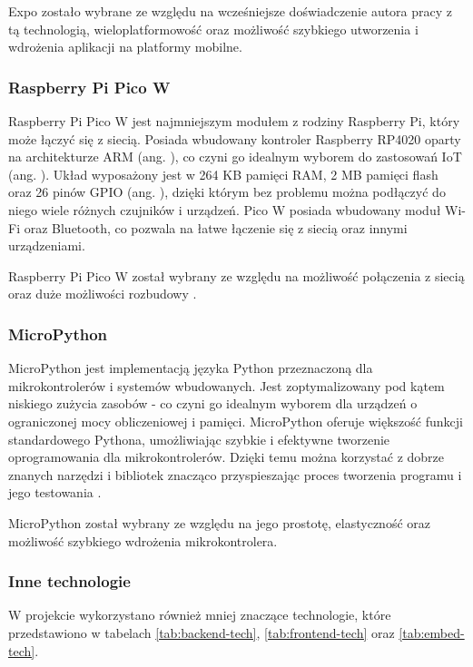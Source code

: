 Expo zostało wybrane ze względu na wcześniejsze doświadczenie autora pracy z tą technologią, wieloplatformowość oraz możliwość szybkiego utworzenia i wdrożenia aplikacji na platformy mobilne.

\subsubsection*{Raspberry Pi Pico W}

Raspberry Pi Pico W jest najmniejszym modułem z rodziny Raspberry Pi, który może łączyć się z siecią. Posiada wbudowany kontroler Raspberry RP4020 oparty na architekturze ARM (ang. ), co czyni go idealnym wyborem do zastosowań IoT (ang. ). Układ wyposażony jest w 264 KB pamięci RAM, 2 MB pamięci flash oraz 26 pinów GPIO (ang. ), dzięki którym bez problemu można podłączyć do niego wiele różnych czujników i urządzeń. Pico W posiada wbudowany moduł Wi-Fi oraz Bluetooth, co pozwala na łatwe łączenie się z siecią oraz innymi urządzeniami.

Raspberry Pi Pico W został wybrany ze względu na możliwość połączenia z siecią oraz duże możliwości rozbudowy \cite{bib:picoW}.

\subsubsection*{MicroPython}

MicroPython jest implementacją języka Python przeznaczoną dla mikrokontrolerów i systemów wbudowanych. Jest zoptymalizowany pod kątem niskiego zużycia zasobów - co czyni go idealnym wyborem dla urządzeń o ograniczonej mocy obliczeniowej i pamięci. MicroPython oferuje większość funkcji standardowego Pythona, umożliwiając szybkie i efektywne tworzenie oprogramowania dla mikrokontrolerów. Dzięki temu można korzystać z dobrze znanych narzędzi i bibliotek znacząco przyspieszając proces tworzenia programu i jego testowania \cite{bib:micropython}.

MicroPython został wybrany ze względu na jego prostotę, elastyczność oraz możliwość szybkiego wdrożenia mikrokontrolera.

\subsubsection*{Inne technologie}

W projekcie wykorzystano również mniej znaczące technologie, które przedstawiono w tabelach \ref{tab:backend-tech}, \ref{tab:frontend-tech} oraz \ref{tab:embed-tech}.

